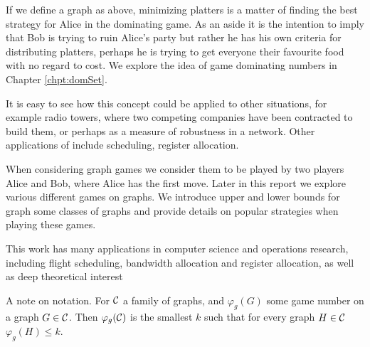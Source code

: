 If we define a graph as above, minimizing platters is a matter of finding the best strategy for Alice in the dominating game. 
As an aside it is the intention to imply that Bob is trying to ruin Alice's party but rather he has his own criteria for distributing platters, perhaps he is trying to get everyone their favourite food with no regard to cost. We explore the idea of game dominating numbers in Chapter \ref{chpt:domSet}.

It is easy to see how this concept could be applied to other situations, for example radio towers, where two competing companies have been contracted to build them, or perhaps as a measure of robustness in a network. Other applications of include scheduling, register allocation.  

When considering graph games we consider them to be played by two players Alice and Bob, where Alice has the first move. Later in this report we explore various different games on graphs. We introduce upper and lower bounds for graph some classes of graphs and provide details on popular strategies when playing these games.   




  
This work has many applications in computer science and operations research, including flight scheduling, bandwidth allocation and register allocation, as well as deep theoretical interest%
    
A note on notation. For $\mathcal{C}$ a family of graphs, and $\varphi_g(G)$ some game number on a graph $G \in \mathcal{C}$. Then $\varphi_g(\mathcal{C})$ is the smallest $k$ such that for every graph $H\in\mathcal{C}$ $\varphi_g(H)\leq k$.   

    
    
    
    
    
    
    
    
    
    
    
    
    
    
    
    
    
    
    
    
    